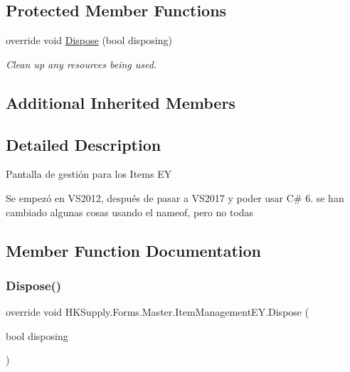 \subsection*{Protected Member Functions}
\begin{DoxyCompactItemize}
\item 
override void \mbox{\hyperlink{class_h_k_supply_1_1_forms_1_1_master_1_1_item_management_e_y_af254133b6c19f606c5916ec6cc21dc29}{Dispose}} (bool disposing)
\begin{DoxyCompactList}\small\item\em Clean up any resources being used. \end{DoxyCompactList}\end{DoxyCompactItemize}
\subsection*{Additional Inherited Members}


\subsection{Detailed Description}
Pantalla de gestión para los Items EY 

Se empezó en V\+S2012, después de pasar a V\+S2017 y poder usar C\# 6. se han cambiado algunas cosas usando el nameof, pero no todas

\subsection{Member Function Documentation}
\mbox{\label{class_h_k_supply_1_1_forms_1_1_master_1_1_item_management_e_y_af254133b6c19f606c5916ec6cc21dc29}} 
\subsubsection{\texorpdfstring{Dispose()}{Dispose()}}
{\footnotesize\ttfamily override void H\+K\+Supply.\+Forms.\+Master.\+Item\+Management\+E\+Y.\+Dispose (\begin{DoxyParamCaption}\item[{bool}]{disposing }\end{DoxyParamCaption})\hspace{0.3cm}{\ttfamily [protected]}}



